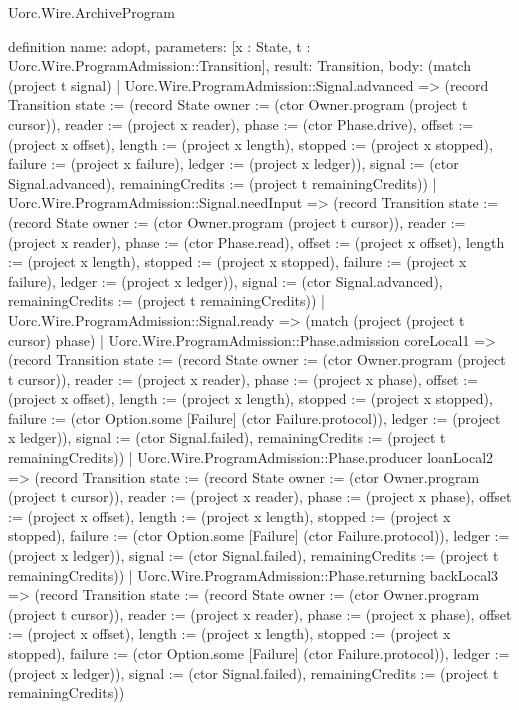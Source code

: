 \begin{lexlean}{Uorc.Wire.ArchiveProgram}
\begin{semanticmodule}
definition{
  name: adopt,
  parameters: [x : State, t : Uorc.Wire.ProgramAdmission::Transition],
  result: Transition,
  body: (match (project t signal)
    | Uorc.Wire.ProgramAdmission::Signal.advanced => (record Transition {state := (record State {owner := (ctor Owner.program (project t cursor)), reader := (project x reader), phase := (ctor Phase.drive), offset := (project x offset), length := (project x length), stopped := (project x stopped), failure := (project x failure), ledger := (project x ledger)}), signal := (ctor Signal.advanced), remainingCredits := (project t remainingCredits)})
    | Uorc.Wire.ProgramAdmission::Signal.needInput => (record Transition {state := (record State {owner := (ctor Owner.program (project t cursor)), reader := (project x reader), phase := (ctor Phase.read), offset := (project x offset), length := (project x length), stopped := (project x stopped), failure := (project x failure), ledger := (project x ledger)}), signal := (ctor Signal.advanced), remainingCredits := (project t remainingCredits)})
    | Uorc.Wire.ProgramAdmission::Signal.ready => (match (project (project t cursor) phase)
      | Uorc.Wire.ProgramAdmission::Phase.admission coreLocal1 => (record Transition {state := (record State {owner := (ctor Owner.program (project t cursor)), reader := (project x reader), phase := (project x phase), offset := (project x offset), length := (project x length), stopped := (project x stopped), failure := (ctor Option.some [Failure] (ctor Failure.protocol)), ledger := (project x ledger)}), signal := (ctor Signal.failed), remainingCredits := (project t remainingCredits)})
      | Uorc.Wire.ProgramAdmission::Phase.producer loanLocal2 => (record Transition {state := (record State {owner := (ctor Owner.program (project t cursor)), reader := (project x reader), phase := (project x phase), offset := (project x offset), length := (project x length), stopped := (project x stopped), failure := (ctor Option.some [Failure] (ctor Failure.protocol)), ledger := (project x ledger)}), signal := (ctor Signal.failed), remainingCredits := (project t remainingCredits)})
      | Uorc.Wire.ProgramAdmission::Phase.returning backLocal3 => (record Transition {state := (record State {owner := (ctor Owner.program (project t cursor)), reader := (project x reader), phase := (project x phase), offset := (project x offset), length := (project x length), stopped := (project x stopped), failure := (ctor Option.some [Failure] (ctor Failure.protocol)), ledger := (project x ledger)}), signal := (ctor Signal.failed), remainingCredits := (project t remainingCredits)})
}
\end{semanticmodule}
\end{lexlean}
